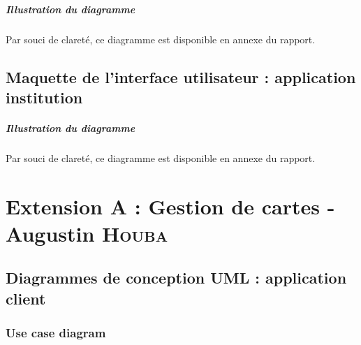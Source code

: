 \documentclass[]{report}
\begin{document}


\vspace*{\fill}

\paragraph{Illustration du diagramme} Par souci de clareté, ce diagramme est disponible en annexe du rapport.

\newpage



\section{Maquette de l'interface utilisateur : application institution}



\vspace*{\fill}

\paragraph{Illustration du diagramme} Par souci de clareté, ce diagramme est disponible en annexe du rapport.

\newpage





\chapter{Extension A : Gestion de cartes - Augustin \textsc{Houba}}



\newpage


\section{Diagrammes de conception UML : application client}

\newpage

\subsection{Use case diagram}
\end{document}
